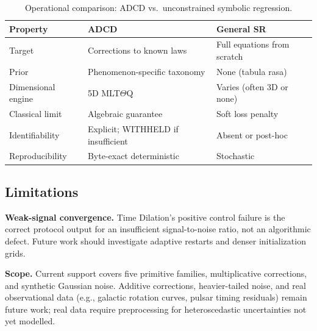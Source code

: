 \documentclass{article}
\begin{document}
\begin{table}[ht]
\small
\caption{Operational comparison: ADCD vs.\ unconstrained symbolic regression.}
\label{tab:comparison}
\centering
\begin{tabular}{@{}p{2.8cm}p{3.5cm}p{4.2cm}@{}}
\toprule
Property & ADCD & General SR \\
\midrule
Target & Corrections to known laws & Full equations from scratch \\
Prior & Phenomenon-specific taxonomy & None (tabula rasa) \\
Dimensional engine & 5D MLT$\Theta$Q & Varies (often 3D or none) \\
Classical limit & Algebraic guarantee & Soft loss penalty \\
Identifiability & Explicit; WITHHELD if insufficient & Absent or post-hoc \\
Reproducibility & Byte-exact deterministic & Stochastic \\
\bottomrule
\end{tabular}
\end{table}

\subsection{Limitations}
\label{sec:limitations}

\textbf{Weak-signal convergence.}
Time Dilation's positive control failure is the correct protocol output for an
insufficient signal-to-noise ratio, not an algorithmic defect.
Future work should investigate adaptive restarts and denser initialization grids.

\textbf{Scope.}
Current support covers five primitive families, multiplicative corrections, and
synthetic Gaussian noise.
Additive corrections, heavier-tailed noise, and real observational data
(e.g., galactic rotation curves, pulsar timing residuals) remain future work;
real data require preprocessing for heteroscedastic uncertainties not yet modelled.
\end{document}

